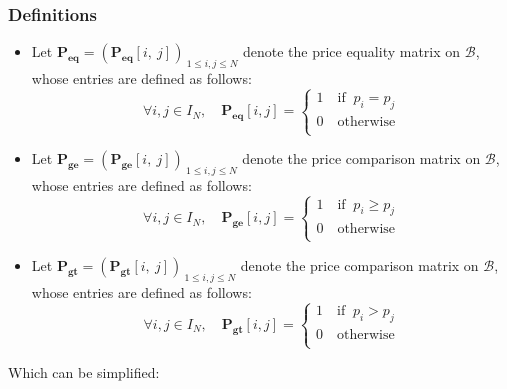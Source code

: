 \subsubsection{Definitions}
\begin{itemize}
    \item Let $\mathbf{P_{eq}} = (\mathbf{P_{eq}}[i, \ j])_{\ 1 \le i, j \le N}$ denote the price equality matrix on $\mathcal{B}$, whose entries are defined as follows:
    \begin{equation*}
        \forall i,j \in I_N, \quad \mathbf{P_{eq}}[i, j] = 
        \begin{cases}
            1  \quad \text{if } \ p_{i} = p_{j} \\
            0  \quad \text{otherwise} \\
        \end{cases}
    \end{equation*}        
    \item Let $\mathbf{P_{ge}} = (\mathbf{P_{ge}}[i, \ j])_{\ 1 \le i, j \le N}$ denote the price comparison matrix on $\mathcal{B}$, whose entries are defined as follows:
    \begin{equation*}
        \forall i,j \in I_N, \quad \mathbf{P_{ge}}[i, j] = 
        \begin{cases}
            1  \quad \text{if } \ p_{i} \ge p_{j} \\
            0  \quad \text{otherwise} \\
        \end{cases}
    \end{equation*}
    \item Let $\mathbf{P_{gt}} = (\mathbf{P_{gt}}[i, \ j])_{\ 1 \le i, j \le N}$ denote the price comparison matrix on $\mathcal{B}$, whose entries are defined as follows:
    \begin{equation*}
        \forall i,j \in I_N, \quad \mathbf{P_{gt}}[i, j] = 
        \begin{cases}
            1  \quad \text{if } \ p_{i} > p_{j} \\
            0  \quad \text{otherwise} \\
        \end{cases}
    \end{equation*}
\end{itemize}
Which can be simplified:    
